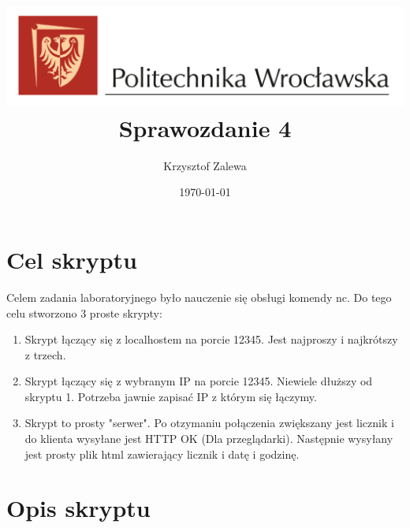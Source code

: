\documentclass{article}
\title{
  \centering
  \includegraphics[width=\textwidth]{images/logo_PWr_kolor_poziom.png}\\
  \fontsize{28pt}{30pt}\selectfont Sprawozdanie 4\\
  }
\author{Krzysztof Zalewa}
\date{\daymonthyear\today}
\begin{document}
    \maketitle
    \pagebreak
    \tableofcontents
    \FloatBarrier
    \raggedright
    \section{Cel skryptu}
        Celem zadania laboratoryjnego było nauczenie się obsługi komendy nc. 
        Do tego celu stworzono 3 proste skrypty:
        \begin{enumerate}
            \item Skrypt łączący się z localhostem na porcie 12345. 
            Jest najproszy i najkrótszy z trzech.
            \item Skrypt łączący się z wybranym IP na porcie 12345.
            Niewiele dłuższy od skryptu 1. 
            Potrzeba jawnie zapisać IP z którym się łączymy.
            \item Skrypt to prosty "serwer". 
            Po otzymaniu połączenia zwiększany jest licznik i do klienta wysyłane jest HTTP OK (Dla przeglądarki). 
            Następnie wysyłany jest prosty plik html zawierający licznik i datę i godzinę.
        \end{enumerate} 
    \section{Opis skryptu}
      
\end{document}
